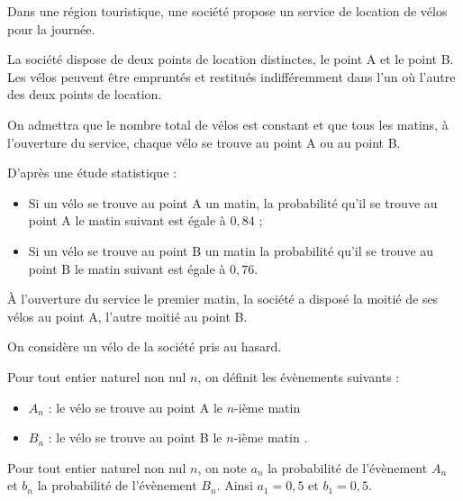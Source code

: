 \medskip

Dans une région touristique, une société propose un service de location de vélos pour la journée.

\smallskip

La société dispose de deux points de location distinctes, le point A et le point B. Les vélos peuvent être empruntés et restitués indifféremment dans l'un où l'autre des deux points de location.

\smallskip

On admettra que le nombre total de vélos est constant et que tous les matins, à l'ouverture du service, chaque vélo se trouve au point A ou au point B.

\smallskip

D'après une étude statistique :

\smallskip

\setlength\parindent{1cm}
\begin{itemize}
\item[$\bullet~~$] Si un vélo se trouve au point A un matin, la probabilité qu'il se trouve au point A le matin suivant est égale à $0,84$ ;
\item[$\bullet~~$] Si un vélo se trouve au point B un matin la probabilité qu'il se trouve au point B le matin suivant est égale à $0,76$.
\end{itemize}
\setlength\parindent{0cm}

À l'ouverture du service le premier matin, la société a disposé la moitié de ses vélos au point A, l'autre moitié au point B.

\smallskip

On considère un vélo de la société pris au hasard.

\smallskip

Pour tout entier naturel non nul $n$, on définit les évènements suivants :

\setlength\parindent{1cm}
\begin{itemize}
\item[$\bullet~~$]$A_n$ : \og le vélo se trouve au point A le $n$-ième matin \fg{}
\item[$\bullet~~$]$B_n$ : \og le vélo se trouve au point B le $n$-ième matin \fg.
\end{itemize}
\setlength\parindent{0cm}

Pour tout entier naturel non nul $n$, on note $a_n$ la probabilité de l'évènement $A_n$ et $b_n$ la probabilité de l'évènement $B_n$. Ainsi $a_1 = 0,5$ et $b_1 =  0,5$.

\medskip


